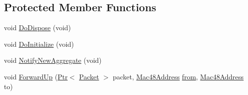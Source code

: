 \subsection*{Protected Member Functions}
\begin{DoxyCompactItemize}
\item 
void \hyperlink{classns3_1_1WifiNetDevice_af7bc39f73e50aecb0dabf775e1c9739e}{Do\+Dispose} (void)
\item 
void \hyperlink{classns3_1_1WifiNetDevice_a6cdb8fb91af055ac64bcd6f3aa9ae545}{Do\+Initialize} (void)
\item 
void \hyperlink{classns3_1_1WifiNetDevice_a5da4bde5eeb1ed73df9753faddefe5bb}{Notify\+New\+Aggregate} (void)
\item 
void \hyperlink{classns3_1_1WifiNetDevice_a6a7b95ac786df55392a0e8dc624b75bf}{Forward\+Up} (\hyperlink{classns3_1_1Ptr}{Ptr}$<$ \hyperlink{classns3_1_1Packet}{Packet} $>$ packet, \hyperlink{classns3_1_1Mac48Address}{Mac48\+Address} \hyperlink{lte__amc_8m_a1b4c81ff74eb1a626b5ade44c81004b3}{from}, \hyperlink{classns3_1_1Mac48Address}{Mac48\+Address} to)
\end{DoxyCompactItemize}
